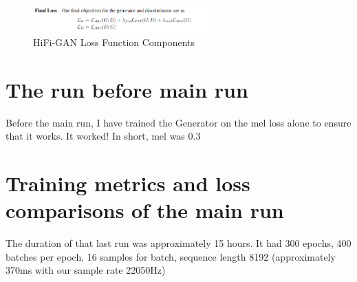 \documentclass[a4paper]{article}
\begin{document}
\begin{figure}[H]
  \centering
  \includegraphics[width=0.6\textwidth]{hifigan-loss-functions.png}
  \caption{HiFi-GAN Loss Function Components}
  \label{fig:hifigan-loss-functions}
\end{figure}


\section{The run before main run}

Before the main run, I have trained the Generator on the mel loss alone to ensure that it works. It worked! In short, mel was 0.3


\section{Training metrics and loss comparisons of the main run}

The duration of that last run was approximately 15 hours. It had 300 epochs, 400 batches per epoch, 16 samples for batch, sequence length 8192 (approximately 370ms with our sample rate 22050Hz)
\end{document}
